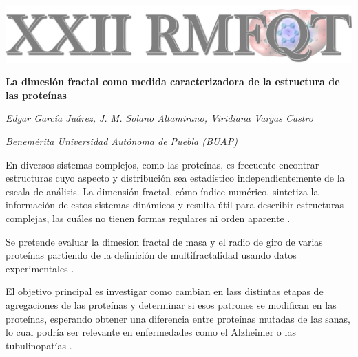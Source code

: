 \documentclass[11pt,a4paper]{article}
\begin{document}
\begin{center}
\includegraphics{rmfqt-2024}
\end{center}
\vspace{0.5cm}
\begin{center}
{\bfseries\LARGE La dimesi\'on fractal como medida caracterizadora de la estructura de las prote\'inas \par}
\vspace{0.5cm}
{\itshape\Large Edgar Garc\'ia Ju\'arez, J. M. Solano Altamirano, Viridiana Vargas Castro \par}
{\itshape\Large Benem\'erita Universidad Aut\'onoma de Puebla (BUAP) \par}
\end{center}
\vspace{0.5cm}
\onehalfspacing %

En diversos sistemas complejos, como las prote\'inas, es frecuente encontrar estructuras cuyo aspecto y distribuci\'on  sea estad\'istico independientemente de la escala de an\'alisis. La dimensi\'on fractal, cómo \'indice num\'erico, sintetiza la informaci\'on de estos sistemas din\'amicos y resulta útil para describir estructuras complejas, las cu\'ales no tienen formas regulares ni orden aparente \cite{Mustafa1996}.

Se pretende evaluar la dimesion fractal de masa y el radio de giro de varias prote\'inas partiendo de la definici\'on de multifractalidad usando datos experimentales \cite{Carrillo2016}.

El objetivo principal es investigar como cambian en lass distintas etapas de agregaciones de las prote\'inas y determinar si esos patrones se modifican en las prote\'inas, esperando obtener una diferencia entre prote\'inas mutadas de las sanas, lo cual podr\'ia ser relevante en enfermedades como el Alzheimer o las tubulinopat\'ias \cite{Mustafa1996,Vicsek1992}.



\end{document}
